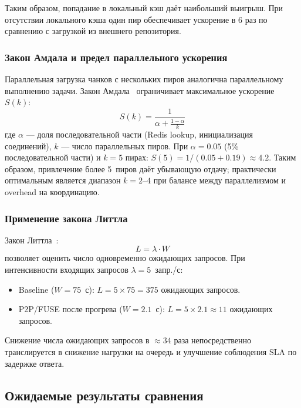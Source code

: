 Таким образом, попадание в локальный кэш даёт наибольший выигрыш. При отсутствии локального кэша один пир обеспечивает ускорение в 6 раз по сравнению с загрузкой из внешнего репозитория.

\subsubsection*{Закон Амдала и предел параллельного ускорения}

Параллельная загрузка чанков с нескольких пиров аналогична параллельному выполнению задачи. Закон Амдала~\cite{amdahl_law} ограничивает максимальное ускорение $S(k)$:
\[
  S(k) = \frac{1}{\alpha + \frac{1-\alpha}{k}}
\]
где $\alpha$ --- доля последовательной части (Redis lookup, инициализация соединений), $k$ --- число параллельных пиров. При $\alpha = 0.05$ (5\% последовательной части) и $k = 5$ пирах: $S(5) = 1 / (0.05 + 0.19) \approx 4.2$. Таким образом, привлечение более 5~пиров даёт убывающую отдачу; практически оптимальным является диапазон $k = 2$--$4$ при балансе между параллелизмом и overhead на координацию.

\subsubsection*{Применение закона Литтла}

Закон Литтла~\cite{little1961}:
\begin{equation}
  L = \lambda \cdot W
  \label{eq:little-evaluation}
\end{equation}
позволяет оценить число одновременно ожидающих запросов. При интенсивности входящих запросов $\lambda = 5$~запр./с:
\begin{itemize}[leftmargin=*]
  \item Baseline ($W = 75$~с): $L = 5 \times 75 = 375$ ожидающих запросов.
  \item P2P/FUSE после прогрева ($W = 2.1$~с): $L = 5 \times 2.1 \approx 11$ ожидающих запросов.
\end{itemize}

Снижение числа ожидающих запросов в $\approx 34$ раза непосредственно транслируется в снижение нагрузки на очередь и улучшение соблюдения SLA по задержке ответа.

\subsection{Ожидаемые результаты сравнения}

